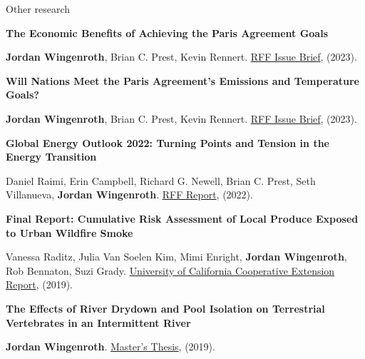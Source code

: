 \documentclass{resume} %
\begin{document}
\begin{rSection}{Other research}

{\bf The Economic Benefits of Achieving the Paris Agreement Goals}
\vspace{-7pt}
\begin{adjustwidth}{12pt}{}
{\small \textbf{Jordan Wingenroth}, Brian C. Prest, Kevin Rennert. \href{https://www.rff.org/publications/issue-briefs/the-economic-benefits-of-achieving-the-paris-agreement-goals/}{RFF Issue Brief}, (2023).}
\end{adjustwidth}

{\bf Will Nations Meet the Paris Agreement's Emissions and Temperature Goals?}
\vspace{-7pt}
\begin{adjustwidth}{12pt}{}
{\small \textbf{Jordan Wingenroth}, Brian C. Prest, Kevin Rennert. \href{https://www.rff.org/publications/issue-briefs/will-nations-meet-the-paris-agreements-emissions-and-temperature-goals/}{RFF Issue Brief}, (2023).}
\end{adjustwidth}

{\bf Global Energy Outlook 2022: Turning Points and Tension in the Energy Transition}
\vspace{-7pt}
\begin{adjustwidth}{12pt}{}
{\small Daniel Raimi, Erin Campbell, Richard G. Newell, Brian C. Prest, Seth Villanueva, \textbf{Jordan Wingenroth}. \href{https://www.rff.org/publications/reports/global-energy-outlook-2022/}{RFF Report}, (2022).}
\end{adjustwidth}

\pagebreak

{\bf Final Report: Cumulative Risk Assessment of Local Produce Exposed to Urban Wildfire Smoke}
\vspace{-7pt}
\begin{adjustwidth}{12pt}{}
{\small Vanessa Raditz, Julia Van Soelen Kim, Mimi Enright, \textbf{Jordan Wingenroth}, Rob Bennaton, Suzi Grady. \href{https://ucanr.edu/sites/SoCo/files/308873.pdf}{University of California Cooperative Extension Report}, (2019).}
\end{adjustwidth}

{\bf The Effects of River Drydown and Pool Isolation on Terrestrial Vertebrates in an Intermittent River}
\vspace{-7pt}
\begin{adjustwidth}{12pt}{}
{\small \textbf{Jordan Wingenroth}. \href{https://digicoll.lib.berkeley.edu/record/140194/files/Spring2019_Wingenroth_Jordan.pdf}{Master's Thesis}, (2019).}
\end{adjustwidth}

\end{rSection}
\end{document}
